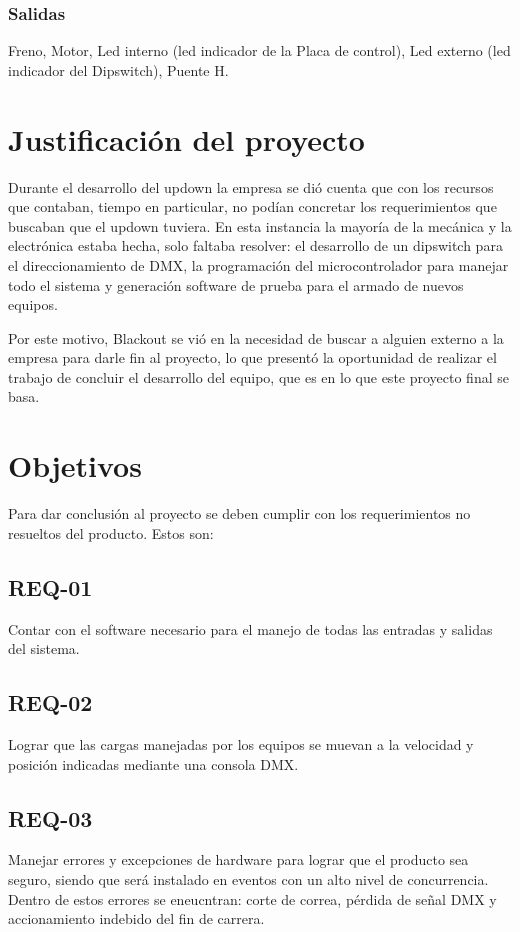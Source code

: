 \subsubsection{Salidas}
Freno, Motor, Led interno (led indicador de la Placa de control), Led externo (led indicador del Dipswitch), Puente H.

\newpage
\section{Justificación del proyecto} \label{sec:\thesection}
Durante el desarrollo del updown la empresa se dió cuenta que con los recursos que contaban, tiempo en particular, no podían concretar los requerimientos que buscaban que el updown tuviera. En esta instancia la mayoría de la mecánica y la electrónica estaba hecha, solo faltaba resolver: el desarrollo de un dipswitch para el direccionamiento de DMX, la programación del microcontrolador para manejar todo el sistema y generación software de prueba para el armado de nuevos equipos.

Por este motivo, Blackout se vió en la necesidad de buscar a alguien externo a la empresa para darle fin al proyecto, lo que presentó la oportunidad de realizar el trabajo de concluir el desarrollo del equipo, que es en lo que este proyecto final se basa.

\section{Objetivos} \label{sec:\thesection}
Para dar conclusión al proyecto se deben cumplir con los requerimientos no resueltos del producto. Estos son:
\subsection{REQ-01}
Contar con el software necesario para el manejo de todas las entradas y salidas del sistema.
\subsection{REQ-02}
Lograr que las cargas manejadas por los equipos se muevan a la velocidad y posición indicadas mediante una consola DMX.
\subsection{REQ-03}
Manejar errores y excepciones de hardware para lograr que el producto sea seguro, siendo que será instalado en eventos con un alto nivel de concurrencia.\\
Dentro de estos errores se eneucntran: corte de correa, pérdida de señal DMX y accionamiento indebido del fin de carrera.
